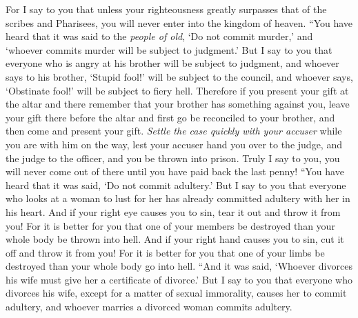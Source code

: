 \begin{biblechapter}
\verse For I say to you that unless your righteousness greatly surpasses that of the scribes and Pharisees, you will never enter into the kingdom of heaven.
 “You have heard that it was said to the \textit{people of old}, ‘Do not commit murder,’ and ‘whoever commits murder will be subject to judgment.’
\verse But I say to you that everyone who is angry at his brother will be subject to judgment, and whoever says to his brother, ‘Stupid fool!’ will be subject to the council, and whoever says, ‘Obstinate fool!’ will be subject to fiery hell.
\verse Therefore if you present your gift at the altar and there remember that your brother has something against you,
\verse leave your gift there before the altar and first go be reconciled to your brother, and then come and present your gift.
\verse \textit{Settle the case quickly with your accuser} while you are with him on the way, lest your accuser hand you over to the judge, and the judge to the officer, and you be thrown into prison.
\verse Truly I say to you, you will never come out of there until you have paid back the last penny!
 “You have heard that it was said, ‘Do not commit adultery.’
\verse But I say to you that everyone who looks at a woman to lust for her has already committed adultery with her in his heart.
\verse And if your right eye causes you to sin, tear it out and throw it from you! For it is better for you that one of your members be destroyed than your whole body be thrown into hell.
\verse And if your right hand causes you to sin, cut it off and throw it from you! For it is better for you that one of your limbs be destroyed than your whole body go into hell.
 “And it was said, ‘Whoever divorces his wife must give her a certificate of divorce.’
\verse But I say to you that everyone who divorces his wife, except for a matter of sexual immorality, causes her to commit adultery, and whoever marries a divorced woman commits adultery.

\end{biblechapter}
